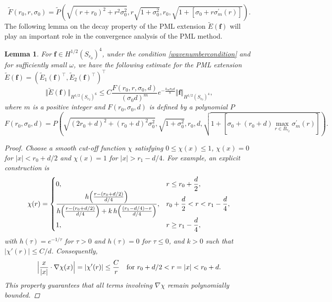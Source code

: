 \documentclass[11pt]{article}
\newcommand{\ds}{\displaystyle}
\newcommand{\sig}{\sigma}
\newcommand{\wid}{\widetilde}
\newcommand{\bs}{\boldsymbol}
\newtheorem{lemma}[theorem]{Lemma}
\begin{document}
\begin{equation*}
\wid{F}(r_0,r,\sig_0)=\wid{P}\left(\sqrt{(r+r_0)^2+r^2\sig_0^2},r\sqrt{1+\sig_0^2},r_0,
\sqrt{1+[\sig_0+r\sig_{m}^{'}(r)]}\right).
\end{equation*}
The following lemma on the decay property of the PML extension $\wid{E}(\bs{f})$ will play an 
important role in the convergence analysis of the PML method.
\begin{lemma}\label{poroelasticPMLpotential}
For $\bs{f}\in H^{1/2}(S_{r_0})^4$, under the condition \eqref{wavenumbercondition} and for 
sufficiently small $\omega$, we have the following
estimate for the PML extension $\wid{E}(\bs{f})=(\wid{E}_1(\bs{f})^{\top},\wid{E}_2(\bs{f})^{\top})^{\top}$
\begin{equation}\label{poropmlfse}
\Vert \wid{E}(\bs{f})\Vert_{ H^{1/2}(S_{r_2})^6}
\leq C\frac{F(r_0,r,\sig_0,d)}{(\sig_0d)^{m}}
e^{-\frac{k_m\sig_0d}{8}}\Vert \bs{f} \Vert_{ H^{1/2}(S_{r_0})^4},
\end{equation} 
where $m$ is a positive integer and $F(r_0,\sig_0,d)$ is defined by a polynomial $P$
\begin{equation*}
F(r_0,\sig_0,d)=P\left(\sqrt{(2r_0+d)^2+(r_0+d)^2\sig_0^2},\sqrt{1+\sig_0^2},r_0,d,
\sqrt{1+[\sig_0+(r_0+d)\max\limits_{r\in B_{r_2}}\sig_{m}^{'}(r)]}\right).
\end{equation*}
\begin{proof}
Choose a smooth cut-off function $\chi$ satisfying $0\leq \chi(x)\leq 1$, $\chi(x)=0$ 
for $\lvert x \rvert <r_0+d/2$ and $\chi(x)=1$ for $\lvert x \rvert >r_1-d/4$. 
For example, an explicit construction is
\begin{equation*}
\chi(r) =
\begin{cases}
0, &\ds r\le r_0+\frac{d}{2},\\
\dfrac{h\Bigl(\frac{r-(r_0+d/2)}{d/4}\Bigr)}
{h\Bigl(\frac{r-(r_0+d/2)}{d/4}\Bigr)
+ k\,h\Bigl(\frac{(r_1-d/4)-r}{d/4}\Bigr)}, &\ds r_0+\frac{d}{2}<r<r_1-\frac{d}{4},\\
1, & r\ge\ds r_1-\frac{d}{4},
\end{cases}
\end{equation*}
with $h(\tau)=e^{-1/\tau}$ for $\tau>0$ and $h(\tau)=0$ for $\tau\le0$, and $k>0$ such that
$|\chi'(r)|\le C/d$. Consequently,
\begin{equation*}
\Bigl|\frac{x}{|x|}\cdot\nabla\chi(x)\Bigr|
= |\chi'(r)| \le \frac{C}{r}\quad\text{for }r_0+d/2<r=|x|<r_0+d.
\end{equation*}
This property guarantees that all terms involving $\nabla\chi$ remain polynomially bounded.

\end{proof}
\end{lemma}
\end{document}
